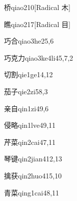 \begin{verbete}{桥}{qiao2}{10}[Radical 木]
\end{verbete}

\begin{verbete}{瞧}{qiao2}{17}[Radical 目]
\end{verbete}

\begin{verbete}{巧合}{qiao3he2}{5,6}
\end{verbete}

\begin{verbete}{巧克力}{qiao3ke4li4}{5,7,2}
\end{verbete}

\begin{verbete}{切割}{qie1ge1}{4,12}
\end{verbete}

\begin{verbete}{茄子}{qie2zi5}{8,3}
\end{verbete}

\begin{verbete}{亲自}{qin1zi4}{9,6}
\end{verbete}

\begin{verbete}{侵略}{qin1lve4}{9,11}
\end{verbete}

\begin{verbete}{芹菜}{qin2cai4}{7,11}
\end{verbete}

\begin{verbete}{琴键}{qin2jian4}{12,13}
\end{verbete}

\begin{verbete}{擒获}{qin2huo4}{15,10}
\end{verbete}

\begin{verbete}{青菜}{qing1cai4}{8,11}
\end{verbete}

